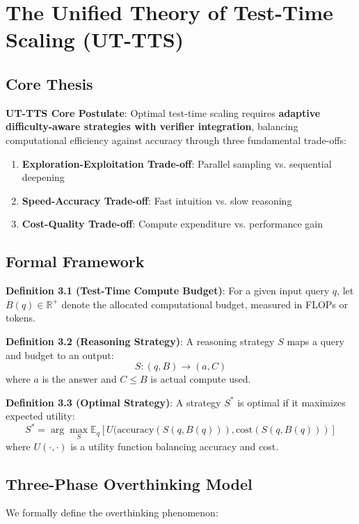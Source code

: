 \documentclass[10pt,preprint]{neurips_2024}
\begin{document}
\section{The Unified Theory of Test-Time Scaling (UT-TTS)}

\subsection{Core Thesis}

\textbf{UT-TTS Core Postulate}: Optimal test-time scaling requires \textbf{adaptive difficulty-aware strategies with verifier integration}, balancing computational efficiency against accuracy through three fundamental trade-offs:

\begin{enumerate}
    \item \textbf{Exploration-Exploitation Trade-off}: Parallel sampling vs. sequential deepening
    \item \textbf{Speed-Accuracy Trade-off}: Fast intuition vs. slow reasoning
    \item \textbf{Cost-Quality Trade-off}: Compute expenditure vs. performance gain
\end{enumerate}

\subsection{Formal Framework}

\textbf{Definition 3.1 (Test-Time Compute Budget)}: For a given input query $q$, let $B(q) \in \mathbb{R}^+$ denote the allocated computational budget, measured in FLOPs or tokens.

\textbf{Definition 3.2 (Reasoning Strategy)}: A reasoning strategy $S$ maps a query and budget to an output:
$$S: (q, B) \rightarrow (a, C)$$
where $a$ is the answer and $C \leq B$ is actual compute used.

\textbf{Definition 3.3 (Optimal Strategy)}: A strategy $S^*$ is optimal if it maximizes expected utility:
$$S^* = \arg\max_S \mathbb{E}_q [U(\text{accuracy}(S(q, B(q))), \text{cost}(S(q, B(q)))]$$
where $U(\cdot, \cdot)$ is a utility function balancing accuracy and cost.

\subsection{Three-Phase Overthinking Model}

We formally define the overthinking phenomenon:
\end{document}
